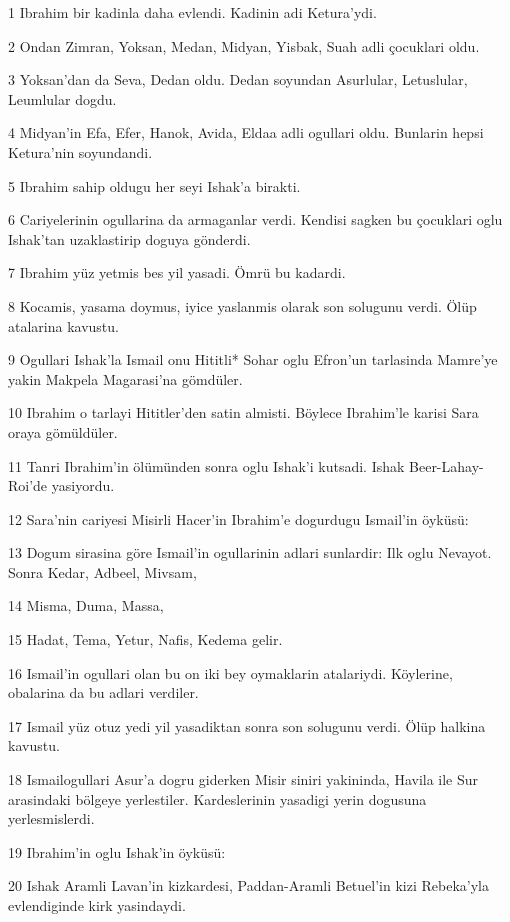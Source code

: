 \par 1 Ibrahim bir kadinla daha evlendi. Kadinin adi Ketura'ydi.
\par 2 Ondan Zimran, Yoksan, Medan, Midyan, Yisbak, Suah adli çocuklari oldu.
\par 3 Yoksan'dan da Seva, Dedan oldu. Dedan soyundan Asurlular, Letuslular, Leumlular dogdu.
\par 4 Midyan'in Efa, Efer, Hanok, Avida, Eldaa adli ogullari oldu. Bunlarin hepsi Ketura'nin soyundandi.
\par 5 Ibrahim sahip oldugu her seyi Ishak'a birakti.
\par 6 Cariyelerinin ogullarina da armaganlar verdi. Kendisi sagken bu çocuklari oglu Ishak'tan uzaklastirip doguya gönderdi.
\par 7 Ibrahim yüz yetmis bes yil yasadi. Ömrü bu kadardi.
\par 8 Kocamis, yasama doymus, iyice yaslanmis olarak son solugunu verdi. Ölüp atalarina kavustu.
\par 9 Ogullari Ishak'la Ismail onu Hititli* Sohar oglu Efron'un tarlasinda Mamre'ye yakin Makpela Magarasi'na gömdüler.
\par 10 Ibrahim o tarlayi Hititler'den satin almisti. Böylece Ibrahim'le karisi Sara oraya gömüldüler.
\par 11 Tanri Ibrahim'in ölümünden sonra oglu Ishak'i kutsadi. Ishak Beer-Lahay-Roi'de yasiyordu.
\par 12 Sara'nin cariyesi Misirli Hacer'in Ibrahim'e dogurdugu Ismail'in öyküsü:
\par 13 Dogum sirasina göre Ismail'in ogullarinin adlari sunlardir: Ilk oglu Nevayot. Sonra Kedar, Adbeel, Mivsam,
\par 14 Misma, Duma, Massa,
\par 15 Hadat, Tema, Yetur, Nafis, Kedema gelir.
\par 16 Ismail'in ogullari olan bu on iki bey oymaklarin atalariydi. Köylerine, obalarina da bu adlari verdiler.
\par 17 Ismail yüz otuz yedi yil yasadiktan sonra son solugunu verdi. Ölüp halkina kavustu.
\par 18 Ismailogullari Asur'a dogru giderken Misir siniri yakininda, Havila ile Sur arasindaki bölgeye yerlestiler. Kardeslerinin yasadigi yerin dogusuna yerlesmislerdi.
\par 19 Ibrahim'in oglu Ishak'in öyküsü:
\par 20 Ishak Aramli Lavan'in kizkardesi, Paddan-Aramli Betuel'in kizi Rebeka'yla evlendiginde kirk yasindaydi.
